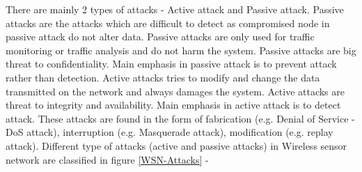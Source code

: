 \par
There are mainly 2 types of attacks \cite{wahid2015survey}- Active attack and Passive attack. Passive attacks are the attacks which are difficult to detect as compromised node in passive attack do not alter data. Passive attacks are only used for traffic monitoring or traffic analysis and do not harm the system. Passive attacks are big threat to confidentiality. Main emphasis in passive attack is to prevent attack rather than detection. Active attacks tries to modify and change the data transmitted on the network and always damages the system. Active attacks are threat to integrity and availability. Main emphasis in active attack is to detect attack. These attacks are found in the form of fabrication (e.g. Denial of Service -DoS attack), interruption (e.g. Masquerade attack), modification (e.g. replay attack).  Different type of attacks (active and passive attacks) in Wireless sensor network are classified in figure \ref{WSN-Attacks} \cite{nayak2015impact, abirami2013sybil, singh2014survey} -
